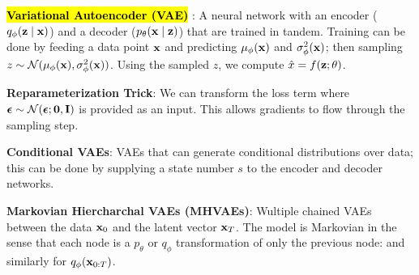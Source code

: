 \documentclass{article}
\begin{document}
  \hl{\textbf{Variational Autoencoder (VAE)}} \cite{kingma2014auto}: A neural network with an encoder ($q_\phi(\mathbf{z}\mid\mathbf{x})$) and a decoder ($p_\theta(\mathbf{x}\mid \mathbf{z})$) that are trained in tandem.
  Training can be done by feeding a data point $\mathbf{x}$ and predicting $\mu_\phi(\mathbf{x})$ and $\sigma^2_\phi(\mathbf{x})$; then sampling $z\sim \mathcal{N}(\mu_\phi(\mathbf{x}),\sigma^2_\phi(\mathbf{x}))$. Using the sampled $z$, we compute $\hat{x}=f(\mathbf{z};\theta)$.

  \textbf{Reparameterization Trick}: We can transform the loss term
  where $\boldsymbol{\epsilon}\sim\mathcal{N}(\boldsymbol{\epsilon};\mathbf{0},\mathbf{I})$ is provided as an input. This allows gradients to flow through the sampling step. 

  \textbf{Conditional VAEs}: VAEs that can generate conditional distributions over data; this can be done by supplying a state number $s$ to the encoder and decoder networks. 

  \textbf{Markovian Hiercharchal VAEs (MHVAEs)}: Wultiple chained VAEs between the data $\mathbf{x}_0$ and the latent vector $\mathbf{x}_T$. The model is Markovian in the sense that each node is a $p_\theta$ or $q_\phi$ transformation of only the previous node:
  and similarly for $q_\phi(\mathbf{x}_{0:T})$.
  
  \begin{center}
  \end{center}
\end{document}
